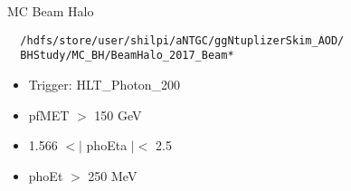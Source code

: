 \documentclass{beamer}
\author{Reese Petersen}
\institute[]{University of Minnesota \\
\medskip
\texttt{pet00831@umn.edu} %
}
\date{\today} %
\title[UMN-CMS Group Meeting]{}
\begin{document}
\begin{frame}[fragile]{MC Beam Halo}
\begin{verbatim}
  /hdfs/store/user/shilpi/aNTGC/ggNtuplizerSkim_AOD/
  BHStudy/MC_BH/BeamHalo_2017_Beam*
\end{verbatim}
    \begin{itemize}
        \item Trigger: HLT\_Photon\_200
        \item pfMET \(>\) 150 GeV
        \item 1.566 \(<|\) phoEta \(|<\) 2.5
        \item phoEt \(>\) 250 MeV
    \end{itemize}
\end{frame}
\end{document}
